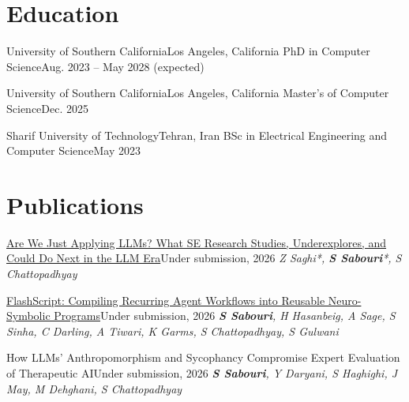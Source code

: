 %







\cvheader

\section{Education}
\resumeSubHeadingListStart

  \resumeSubheading
    {University of Southern California}{Los Angeles, California}
    {PhD in Computer Science}{Aug. 2023 -- May 2028 (expected)}

  \resumeSubheading
    {University of Southern California}{Los Angeles, California}
    {Master's of Computer Science}{Dec. 2025}

  \resumeSubheading
    {Sharif University of Technology}{Tehran, Iran}
    {BSc in Electrical Engineering and Computer Science}{May 2023}

\resumeSubHeadingListEnd

\section{Publications}
\resumeSubHeadingListStart

  \cventry
    {\href{https://arxiv.org/abs/2611.04206}{Are We Just Applying LLMs? What SE Research Studies, Underexplores, and Could Do Next in the LLM Era}}{Under submission, 2026}
    {\textit{Z Saghi*, \textbf{S Sabouri}*, S Chattopadhyay}}

  \cventry
    {\href{https://arxiv.org/abs/2610.33876}{FlashScript: Compiling Recurring Agent Workflows into Reusable Neuro-Symbolic Programs}}{Under submission, 2026}
    {\textit{\textbf{S Sabouri}, H Hasanbeig, A Sage, S Sinha, C Darling, A Tiwari, K Garms, S Chattopadhyay, S Gulwani}}

  \cventry
    {How LLMs' Anthropomorphism and Sycophancy Compromise Expert Evaluation of Therapeutic AI}{Under submission, 2026}
    {\textit{\textbf{S Sabouri}, Y Daryani, S Haghighi, J May, M Dehghani, S Chattopadhyay}}

